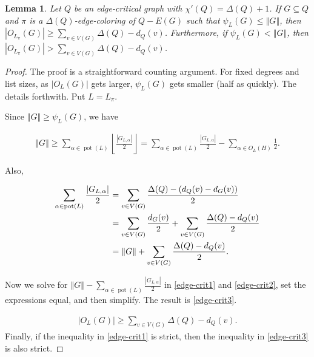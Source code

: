 \documentclass[12pt]{article}
\theoremstyle{plain}
\newtheorem{lem}[thm]{Lemma}
\theoremstyle{definition}
\theoremstyle{remark}
\newcommand{\card}[1]{\left|#1\right|}
\newcommand{\size}[1]{\left\Vert#1\right\Vert}
\newcommand{\floor}[1]{\left\lfloor#1\right\rfloor}
\newcommand{\pot}{\operatorname{pot}}
\begin{document}
\begin{lem}\label{LowPsiGivesManyOddColors}
	Let $Q$ be an edge-critical graph with $\chi'(Q) = \Delta(Q) + 1$. If $G
	\subseteq Q$ and $\pi$ is a $\Delta(Q)$-edge-coloring of $Q - E(G)$ such that
	$\psi_L(G) \le \size{G}$, then $\card{O_{L_\pi}(G)} \ge \sum_{v \in V(G)}
	\Delta(Q) - d_Q(v)$.  Furthermore, if $\psi_L(G) < \size{G}$, then
	$\card{O_{L_\pi}(G)} > \sum_{v \in V(G)} \Delta(Q) - d_Q(v)$.
\end{lem}
\begin{proof}
	The proof is a straightforward counting argument.  For fixed degrees and list
	sizes, as $\card{O_L(G)}$ gets larger, $\psi_L(G)$ gets smaller (half as
	quickly).  The details forthwith.  Put $L = L_\pi$.
	
	Since $\size{G} \ge \psi_L(G)$, we have 
	
	\begin{align}
	\label{edge-crit1}
	\size{G} \ge 
	\sum_{\alpha \in \pot(L)} \floor{\frac{\card{G_{L, \alpha}}}{2}}  =
	\sum_{\alpha \in \pot(L)} \frac{\card{G_{L, \alpha}}}{2} -  \sum_{\alpha \in
		O_L(H)} \frac12 
	.\end{align}
	
	\noindent 
	Also,
	
	\begin{align}
	\sum_{\alpha \in \pot(L)} \frac{\card{G_{L, \alpha}}}{2} 
	&= \sum_{v \in V(G)} \frac{\Delta(Q) - (d_Q(v)-d_G(v))}{2} \notag\\
	&= \sum_{v \in V(G)} \frac{d_G(v)}{2} + \sum_{v \in V(G)} \frac{\Delta(Q) - d_Q(v)}{2}\notag\\
	&= \size{G} +  \sum_{v \in V(G)} \frac{\Delta(Q) - d_Q(v)}{2}.
	\label{edge-crit2}
	\end{align}
	
	\noindent Now we solve for $\size{G}-
	\sum_{\alpha \in \pot(L)} \frac{\card{G_{L, \alpha}}}{2}$ in 
	\eqref{edge-crit1} and \eqref{edge-crit2}, set the expressions equal, and then
	simplify.  The result is \eqref{edge-crit3}.
	
	\begin{align}
	\card{O_L(G)} \ge \sum_{v \in V(G)} \Delta(Q) - d_Q(v).
	\label{edge-crit3}
	\end{align}
	Finally, if the inequality in \eqref{edge-crit1} is strict, then the inequality
	in \eqref{edge-crit3} is also strict.
\end{proof}
\end{document}
